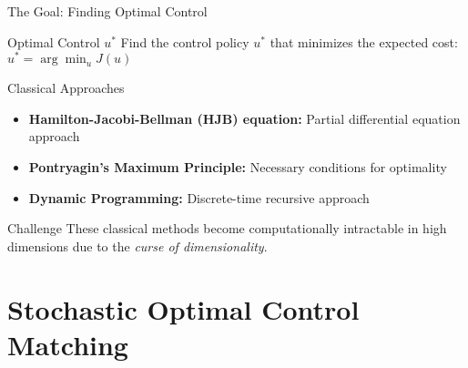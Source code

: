 \documentclass[aspectratio=169,xcolor=dvipsnames]{beamer}
\begin{document}
\begin{frame}{The Goal: Finding Optimal Control}
    \begin{block}{Optimal Control $u^*$}
        Find the control policy $u^*$ that minimizes the expected cost: $u^* = \arg\min_u J(u)$
    \end{block}
    
    \vspace{0.3cm}
    
    \begin{block}{Classical Approaches}
        \begin{itemize}
            \item \textbf{Hamilton-Jacobi-Bellman (HJB) equation:} Partial differential equation approach
            \item \textbf{Pontryagin's Maximum Principle:} Necessary conditions for optimality
            \item \textbf{Dynamic Programming:} Discrete-time recursive approach
        \end{itemize}
    \end{block}
    
    \vspace{0.3cm}
    
    \begin{alertblock}{Challenge}
        These classical methods become computationally intractable in high dimensions due to the \textit{curse of dimensionality}.
    \end{alertblock}
\end{frame}



\section{Stochastic Optimal Control Matching}
\end{document}
